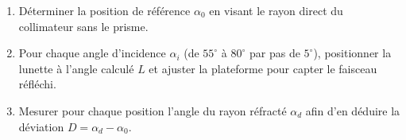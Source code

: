 \begin{enumerate}
    \item Déterminer la position de référence $\alpha_0$ en visant le rayon direct du collimateur sans le prisme.
    \item Pour chaque angle d'incidence $\alpha_i$ (de $55^{\circ}$ à $80^{\circ}$ par pas de $5^{\circ}$), positionner la lunette à l'angle calculé $L$ et ajuster la plateforme pour capter le faisceau réfléchi.
    \item Mesurer pour chaque position l'angle du rayon réfracté $\alpha_d$ afin d'en déduire la déviation $D = \alpha_d - \alpha_0$.
\end{enumerate}